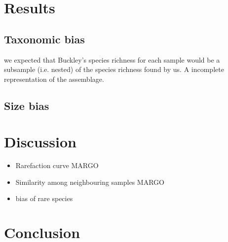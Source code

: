\documentclass[a4paper]{article}
\begin{document}

\section{Results}


	\subsection{Taxonomic bias} we expected that Buckley's species richness for each sample would be a subsample (i.e. nested) of the species richness found by us. A incomplete representation of the assemblage.

	\subsection{Size bias}






\section{Discussion}

\begin{itemize}
\item Rarefaction curve MARGO
\item Similarity among neighbouring samples MARGO
\item bias of rare species
\end{itemize}





\section{Conclusion}





\label{Bibliography}
\end{document}
